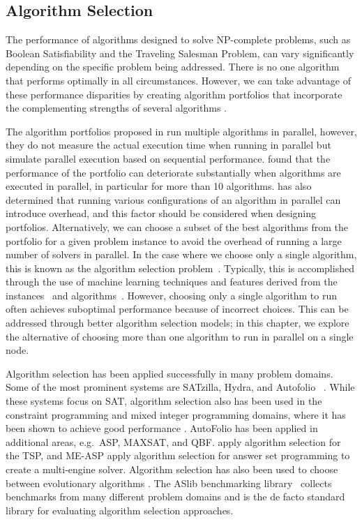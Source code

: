 \subsection{Algorithm Selection}
The performance of algorithms designed to solve NP-complete problems, such as Boolean Satisfiability and the Traveling Salesman Problem, can vary significantly depending on the specific problem being addressed. There is no one algorithm that performs optimally in all circumstances. However, we can take advantage of these performance disparities by creating algorithm portfolios that incorporate the complementing strengths of several algorithms \cite{GOMES200143,Huberman1997}. 

The algorithm portfolios proposed in \cite{GOMES200143,Huberman1997} run multiple algorithms in parallel, however, they do not measure the actual execution time when running in parallel but simulate parallel execution based on sequential performance. \cite{pmlr-v140-kashgarani21a} found that the performance of the portfolio can deteriorate substantially when algorithms are executed in parallel, in particular for more than 10 algorithms. \cite{LINDAUER2017272} has also determined that running various configurations of an algorithm in parallel can introduce overhead, and this factor should be considered when designing portfolios. Alternatively, we can choose a subset of the best algorithms from the portfolio for a given problem instance to avoid the overhead of running a large number of solvers in parallel. In the case where we choose only a single algorithm, this is known as the algorithm selection problem~\cite{Rice1976}. Typically, this is accomplished through the use of machine learning techniques and features derived from the instances~\cite{Kotthoff2014,10.1162/evco_a_00242} and algorithms~\cite{pmlr-v188-pulatov22a}. However, choosing only a single algorithm to run often achieves suboptimal performance because of incorrect choices. This can be addressed through better algorithm selection models; in this chapter, we explore the alternative of choosing more than one algorithm to run in parallel on a single node.

Algorithm selection has been applied successfully in many problem domains. Some of the most prominent systems are SATzilla, Hydra, and Autofolio ~\cite{satzilla,lindauer2015autofolio,10.5555/2898607.2898641}. While these systems focus on SAT, algorithm selection also has been used in the constraint programming and mixed integer programming domains, where it has been shown to achieve good performance \cite{cphydra,XuEtAl11}. AutoFolio has been applied in additional areas, e.g.\ ASP, MAXSAT, and QBF. \cite{10.1162/evco_a_00215} apply algorithm selection for the TSP, and ME-ASP \cite{maratea2014multi} apply algorithm selection for answer set programming to create a multi-engine solver. Algorithm selection has also been used to choose between evolutionary algorithms \cite{HU201268, yuen2019selecting, Maturana2012, 9ae8443ad82b4056bccf7102c0056152}.
The ASlib benchmarking library~\cite{BISCHL201641} collects benchmarks from many different problem domains and is the de facto standard library for evaluating algorithm selection approaches.

